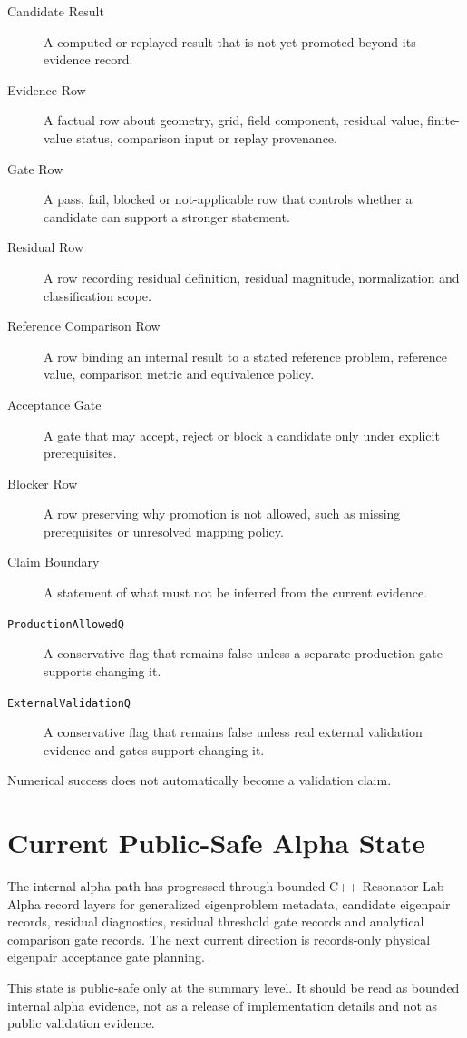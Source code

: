 \documentclass[11pt,a4paper]{article}
\newcommand{\code}[1]{\texttt{#1}}
\begin{document}
\begin{description}
  \item[Candidate Result] A computed or replayed result that is not yet promoted beyond its evidence record.
  \item[Evidence Row] A factual row about geometry, grid, field component, residual value, finite-value status, comparison input or replay provenance.
  \item[Gate Row] A pass, fail, blocked or not-applicable row that controls whether a candidate can support a stronger statement.
  \item[Residual Row] A row recording residual definition, residual magnitude, normalization and classification scope.
  \item[Reference Comparison Row] A row binding an internal result to a stated reference problem, reference value, comparison metric and equivalence policy.
  \item[Acceptance Gate] A gate that may accept, reject or block a candidate only under explicit prerequisites.
  \item[Blocker Row] A row preserving why promotion is not allowed, such as missing prerequisites or unresolved mapping policy.
  \item[Claim Boundary] A statement of what must not be inferred from the current evidence.
  \item[\code{ProductionAllowedQ}] A conservative flag that remains false unless a separate production gate supports changing it.
  \item[\code{ExternalValidationQ}] A conservative flag that remains false unless real external validation evidence and gates support changing it.
\end{description}

Numerical success does not automatically become a validation claim.

\section{Current Public-Safe Alpha State}

The internal alpha path has progressed through bounded C++ Resonator Lab Alpha record layers for generalized eigenproblem metadata, candidate eigenpair records, residual diagnostics, residual threshold gate records and analytical comparison gate records. The next current direction is records-only physical eigenpair acceptance gate planning.

This state is public-safe only at the summary level. It should be read as bounded internal alpha evidence, not as a release of implementation details and not as public validation evidence.
\end{document}
